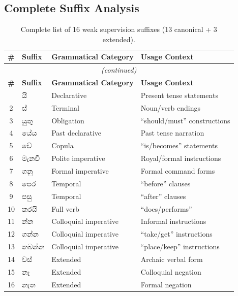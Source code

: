 \documentclass[12pt, a4paper, twoside]{report}
\begin{document}
\begin{appendices}

\chapter{Complete Suffix Analysis}
\label{app:suffixes}

\begin{longtable}{clp{3cm}p{5cm}}
\caption{Complete list of 16 weak supervision suffixes (13 canonical + 3 extended).} \\
\toprule
\textbf{\#} & \textbf{Suffix} & \textbf{Grammatical Category} & \textbf{Usage Context} \\
\midrule
\endfirsthead
\multicolumn{4}{c}{\textit{(continued)}} \\
\toprule
\textbf{\#} & \textbf{Suffix} & \textbf{Grammatical Category} & \textbf{Usage Context} \\
\midrule
\endhead
\bottomrule
\endfoot
1 & යි & Declarative & Present tense statements \\
2 & ස් & Terminal & Noun/verb endings \\
3 & යුතු & Obligation & ``should/must'' constructions \\
4 & යේය & Past declarative & Past tense narration \\
5 & වේ & Copula & ``is/becomes'' statements \\
6 & මැනවි & Polite imperative & Royal/formal instructions \\
7 & ගනු & Formal imperative & Formal command forms \\
8 & පෙර & Temporal & ``before'' clauses \\
9 & පසු & Temporal & ``after'' clauses \\
10 & කරයි & Full verb & ``does/performs'' \\
11 & න්න & Colloquial imperative & Informal instructions \\
12 & ගන්න & Colloquial imperative & ``take/get'' instructions \\
13 & තබන්න & Colloquial imperative & ``place/keep'' instructions \\
\midrule
14 & වස් & Extended & Archaic verbal form \\
15 & නෑ & Extended & Colloquial negation \\
16 & නැත & Extended & Formal negation \\
\end{longtable}



\end{appendices}
\end{document}

